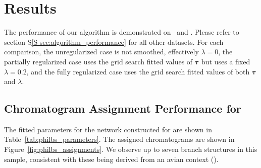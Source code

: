 \section{Results}
The performance of our algorithm is demonstrated on \philbs \ and \rphumanserum.
Please refer to section S\ref{S-sec:algorithm_performance} for all other datasets.
For each comparison, the unregularized case is not smoothed, effectively $\lambda = 0$,
the partially regularized case uses the grid search fitted values of $\mathbf{\tau}$ but
uses a fixed $\lambda = 0.2$, and the fully regularized case uses the grid search fitted
values of both $\mathbf{\tau}$ and $\lambda$.

\subsection{Chromatogram Assignment Performance for \philbs}
    The fitted parameters for the network constructed for \philbs are shown in
    Table~\ref{tab:philbs_parameters}. The assigned chromatograms are shown in
    Figure~\ref{fig:philbs_assignments}. We observe up to seven branch structures in
    this sample, consistent with these \nglycans being derived from an avian context
    (\cite{Stanley2009,Khatri2016a}).

